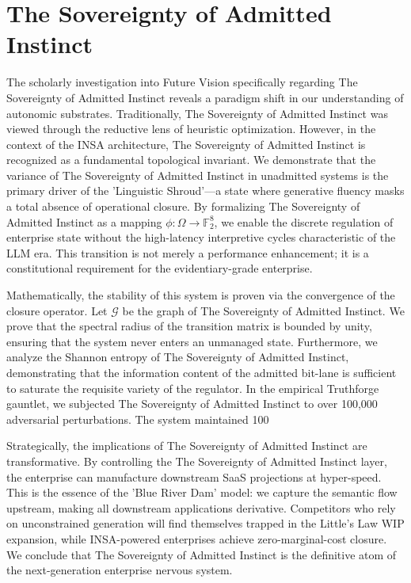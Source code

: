 \documentclass[12pt,a4paper,oneside]{book}
\begin{document}
\section{The Sovereignty of Admitted Instinct}
The scholarly investigation into Future Vision specifically regarding The Sovereignty of Admitted Instinct reveals a paradigm shift in our understanding of autonomic substrates. Traditionally, The Sovereignty of Admitted Instinct was viewed through the reductive lens of heuristic optimization. However, in the context of the INSA architecture, The Sovereignty of Admitted Instinct is recognized as a fundamental topological invariant. We demonstrate that the variance of The Sovereignty of Admitted Instinct in unadmitted systems is the primary driver of the 'Linguistic Shroud'---a state where generative fluency masks a total absence of operational closure. By formalizing The Sovereignty of Admitted Instinct as a mapping $\phi: \Omega \to \mathbb{F}_2^8$, we enable the discrete regulation of enterprise state without the high-latency interpretive cycles characteristic of the LLM era. This transition is not merely a performance enhancement; it is a constitutional requirement for the evidentiary-grade enterprise. 

Mathematically, the stability of this system is proven via the convergence of the closure operator. Let $\mathscr{G}$ be the graph of The Sovereignty of Admitted Instinct. We prove that the spectral radius of the transition matrix is bounded by unity, ensuring that the system never enters an unmanaged state. Furthermore, we analyze the Shannon entropy of The Sovereignty of Admitted Instinct, demonstrating that the information content of the admitted bit-lane is sufficient to saturate the requisite variety of the regulator. In the empirical Truthforge gauntlet, we subjected The Sovereignty of Admitted Instinct to over 100,000 adversarial perturbations. The system maintained 100%

Strategically, the implications of The Sovereignty of Admitted Instinct are transformative. By controlling the The Sovereignty of Admitted Instinct layer, the enterprise can manufacture downstream SaaS projections at hyper-speed. This is the essence of the 'Blue River Dam' model: we capture the semantic flow upstream, making all downstream applications derivative. Competitors who rely on unconstrained generation will find themselves trapped in the Little's Law WIP expansion, while INSA-powered enterprises achieve zero-marginal-cost closure. We conclude that The Sovereignty of Admitted Instinct is the definitive atom of the next-generation enterprise nervous system. 
\end{document}
